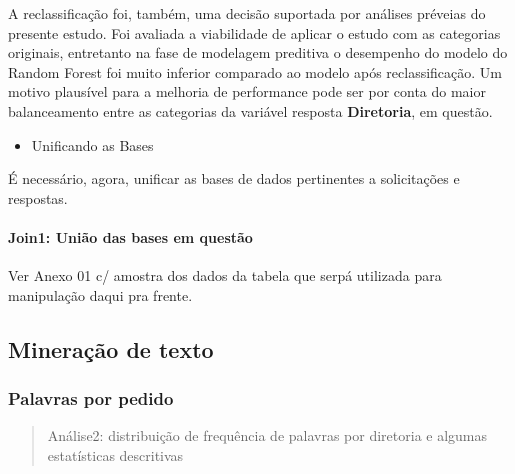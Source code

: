 \documentclass[]{article}
\newenvironment{Shaded}{\begin{snugshade}}{\end{snugshade}}
\newcommand{\KeywordTok}[1]{\textcolor[rgb]{0.13,0.29,0.53}{\textbf{#1}}}
\newcommand{\DataTypeTok}[1]{\textcolor[rgb]{0.13,0.29,0.53}{#1}}
\newcommand{\StringTok}[1]{\textcolor[rgb]{0.31,0.60,0.02}{#1}}
\newcommand{\CommentTok}[1]{\textcolor[rgb]{0.56,0.35,0.01}{\textit{#1}}}
\newcommand{\OperatorTok}[1]{\textcolor[rgb]{0.81,0.36,0.00}{\textbf{#1}}}
\newcommand{\NormalTok}[1]{#1}
\providecommand{\tightlist}{%
  \setlength{\itemsep}{0pt}\setlength{\parskip}{0pt}}
\let\oldparagraph\paragraph
\renewcommand{\paragraph}[1]{\oldparagraph{#1}\mbox{}}
\begin{document}
A reclassificação foi, também, uma decisão suportada por análises
préveias do presente estudo. Foi avaliada a viabilidade de aplicar o
estudo com as categorias originais, entretanto na fase de modelagem
preditiva o desempenho do modelo do Random Forest foi muito inferior
comparado ao modelo após reclassificação. Um motivo plausível para a
melhoria de performance pode ser por conta do maior balanceamento entre
as categorias da variável resposta \textbf{Diretoria}, em questão.

\begin{itemize}
\tightlist
\item
  Unificando as Bases
\end{itemize}

É necessário, agora, unificar as bases de dados pertinentes a
solicitações e respostas.

\paragraph{Join1: União das bases em
questão}\label{join1-uniao-das-bases-em-questao}

\begin{Shaded}
\end{Shaded}

Ver Anexo 01 c/ amostra dos dados da tabela que serpá utilizada para
manipulação daqui pra frente.

\subsection{Mineração de texto}\label{mineracao-de-texto}

\subsubsection{Palavras por pedido}\label{palavras-por-pedido}

\begin{quote}
Análise2: distribuição de frequência de palavras por diretoria e algumas
estatísticas descritivas
\end{quote}
\end{document}

